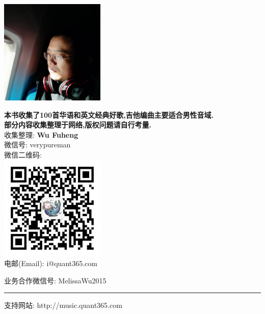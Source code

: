 
\begin{center}
\vspace{10mm}
\includegraphics[width=50mm]{img/me.png}\\
\vspace{10mm}
\vspace*{1\baselineskip}

\textbf{本书收集了100首华语和英文经典好歌,吉他编曲主要适合男性音域.}\\
\textbf{部分内容收集整理于网络,版权问题请自行考量.}\\


收集整理: \textbf{Wu Fuheng} \\
微信号: verypureman \\
微信二维码:\\
\includegraphics[width=50mm]{img/wechat.jpg}\\
电邮(Email): i@quant365.com


\vspace{5mm}

业务合作微信号: MelissaWu2015

\end{center}

\vfill
\noindent\rule{6cm}{0.4pt}

支持网站: http://music.quant365.com \\
\pagebreak
